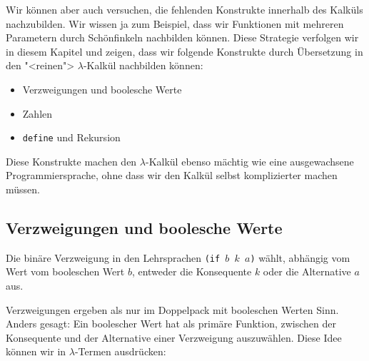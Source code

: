 Wir können aber auch versuchen, die fehlenden Konstrukte innerhalb des
Kalküls nachzubilden.  Wir wissen ja zum Beispiel, dass wir Funktionen
mit mehreren Parametern durch Schönfinkeln nachbilden können.  Diese
Strategie verfolgen wir in diesem Kapitel und zeigen, dass wir
folgende Konstrukte durch Übersetzung in den "<reinen">
$\lambda$-Kalkül nachbilden können:
%
\begin{itemize}
\item Verzweigungen und boolesche Werte
\item Zahlen
\item \lstinline{define} und Rekursion
\end{itemize}
%
Diese Konstrukte machen den $\lambda$-Kalkül ebenso mächtig wie eine
ausgewachsene Programmiersprache, ohne dass wir den Kalkül selbst
komplizierter machen müssen.

\subsection{Verzweigungen und boolesche Werte}
\label{sec:booleans}
%
Die binäre Verzweigung in den Lehrsprachen
\texttt{(if \(b\) \(k\) \(a\))} wählt, abhängig vom Wert vom
booleschen Wert $b$, entweder die Konsequente
$k$ oder die Alternative $a$ aus.

Verzweigungen ergeben als nur im Doppelpack mit booleschen Werten
Sinn.  Anders gesagt: Ein boolescher Wert hat als primäre Funktion,
zwischen der Konsequente und der Alternative einer Verzweigung
auszuwählen.  Diese Idee können wir in $\lambda$-Termen ausdrücken:

